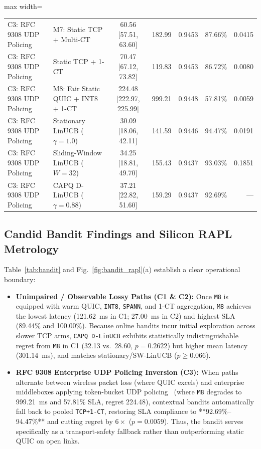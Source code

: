 \documentclass[10pt,journal,compsoc]{IEEEtran}
\begin{document}
\begin{table}[!t]
\begin{adjustbox}{max width=\textwidth}
\begin{tabular}{llcrrrr}
\midrule
C3: RFC 9308 UDP Policing & M7: Static TCP + Multi-CT & 60.56 [57.51, 63.60] & 182.99 & 0.9453 & 87.66\% & 0.0415 \\
C3: RFC 9308 UDP Policing & Static TCP + 1-CT & 70.47 [67.12, 73.82] & 119.83 & 0.9453 & 86.72\% & 0.0080 \\
C3: RFC 9308 UDP Policing & M8: Fair Static QUIC + INT8 + 1-CT & 224.48 [222.97, 225.99] & 999.21 & 0.9448 & 57.81\% & 0.0059 \\
C3: RFC 9308 UDP Policing & Stationary LinUCB ($\gamma=1.0$) & 30.09 [18.06, 42.11] & 141.59 & 0.9446 & 94.47\% & 0.0191 \\
C3: RFC 9308 UDP Policing & Sliding-Window LinUCB ($W=32$) & 34.25 [18.81, 49.70] & 155.43 & 0.9437 & 93.03\% & 0.1851 \\
C3: RFC 9308 UDP Policing & CAPQ D-LinUCB ($\gamma=0.88$) & 37.21 [22.82, 51.60] & 159.29 & 0.9437 & 92.69\% & --- \\
\bottomrule
\end{tabular}
\end{adjustbox}
\end{table}

\subsection{Candid Bandit Findings and Silicon RAPL Metrology}
Table~\ref{tab:bandit} and Fig.~\ref{fig:bandit_rapl}(a) establish a clear operational boundary:
\begin{itemize}
\item \textbf{Unimpaired / Observable Lossy Paths (C1 \& C2):} Once \texttt{M8} is equipped with warm QUIC, \texttt{INT8}, \texttt{SPANN}, and 1-CT aggregation, \texttt{M8} achieves the lowest latency (121.62~ms in C1; 27.00~ms in C2) and highest SLA (89.44\% and 100.00\%). Because online bandits incur initial exploration across slower TCP arms, \texttt{CAPQ D-LinUCB} exhibits statistically indistinguishable regret from \texttt{M8} in C1 (32.13 vs.\ 28.60, $p = 0.2622$) but higher mean latency (301.14~ms), and matches stationary/SW-LinUCB ($p \ge 0.066$).
\item \textbf{RFC 9308 Enterprise UDP Policing Inversion (C3):} When paths alternate between wireless packet loss (where QUIC excels) and enterprise middleboxes applying token-bucket UDP policing~\cite{rfc9308} (where \texttt{M8} degrades to 999.21~ms and 57.81\% SLA, regret 224.48), contextual bandits automatically fall back to pooled \texttt{TCP+1-CT}, restoring SLA compliance to **92.69\%--94.47\%** and cutting regret by $6\times$ ($p = 0.0059$). Thus, the bandit serves specifically as a transport-safety fallback rather than outperforming static QUIC on open links.
\end{itemize}
\end{document}

